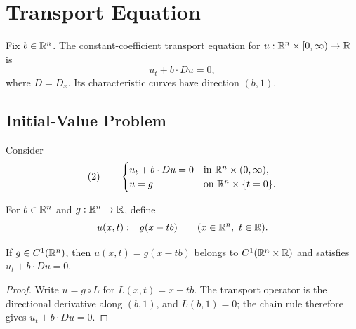 
\section{Transport Equation}
\label{sec:transport-equation}

Fix $b\in\mathbb{R}^n$. The constant-coefficient transport equation for
$u:\mathbb{R}^n\times[0,\infty)\to\mathbb{R}$ is
$$u_t+b\cdot Du=0,$$
where $D=D_x$. Its characteristic curves have direction $(b,1)$.

\subsection{Initial-Value Problem}
\label{sec:transport-equation-initial-value-problem}

Consider
$$(2)\qquad
\begin{cases}
u_t+b\cdot Du=0&\text{in }\mathbb{R}^n\times(0,\infty),\\
u=g&\text{on }\mathbb{R}^n\times\{t=0\}.
\end{cases}$$

\begin{definition}
\label{def:transport-explicit-solution}




For $b\in\mathbb{R}^n$ and $g:\mathbb{R}^n\to\mathbb{R}$, define
$$u(x,t):=g(x-tb)\qquad(x\in\R^n,\ t\in\R).$$
\end{definition}

\begin{theorem}
\label{thm:transport-ivp-solution}





If $g\in C^1(\mathbb{R}^n)$, then $u(x,t)=g(x-tb)$ belongs to
$C^1(\mathbb{R}^n\times\mathbb{R})$ and satisfies $u_t+b\cdot Du=0$.
\end{theorem}
\begin{proof}

\sketch Write $u=g\circ L$ for $L(x,t)=x-tb$. The transport operator is the
directional derivative along $(b,1)$, and $L(b,1)=0$; the chain rule therefore
gives $u_t+b\cdot Du=0$.
\end{proof}

